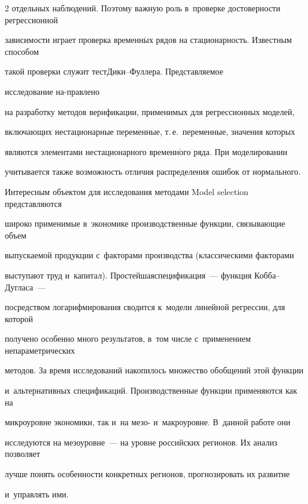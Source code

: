 \begin{multicols}{2}
отдельных \mbox{наблюдений}. Поэтому важ\-ную роль в~проверке достоверности регрессионной 


зависимости играет проверка временн$\acute{\mbox{ы}}$х рядов на стационарность. Известным способом 


такой проверки служит тест\linebreak Ди\-ки--Фул\-ле\-ра. Представляемое 


исследование на-\linebreak правлено 


на разработку методов верификации, применимых для регрессионных моделей, 


вклю\-чающих нестационарные переменные, т.\,е.\ переменные, значения которых 


являются элементами нестационарного временн$\acute{\mbox{о}}$го ряда. При моделировании 


учитывается также возможность отличия распределения ошибок от нормального.


   


    Интересным объектом для исследования методами Model selection пред\-став\-ля\-ют\-ся 


широко применимые в~экономике производственные функции, связывающие объем 


выпускаемой продукции с~факторами производства (классическими факторами 


выступают труд и~капитал). Простейшая\linebreak спецификация~--- функция Коб\-ба--Дуг\-ла\-са~--- 


посредством логарифмирования сводится к~модели линейной регрессии, для которой 


получено особенно много результатов, в~том чис\-ле с~применением непараметрических 


методов. За время исследований накопилось множество обобщений этой функции 


и~альтернативных спецификаций. Производственные функции применяются как на 


микроуровне экономики, так и~на мезо- и~макроуровне. В~данной работе они 


исследуются на мезоуровне~--- на уровне российских регионов. Их анализ позволяет 


лучше понять особенности конкретных регионов, прогнозировать их развитие 


и~управлять ими.


{ %





}
\end{multicols}
